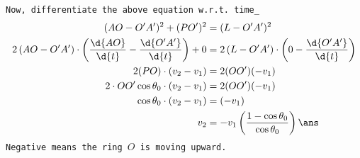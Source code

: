 \documentclass{article}
\begin{document}
\texttt{Now, differentiate the above equation w.r.t. time\_}
\addtolength{\jot}{2ex}
\begin{align*}
(AO-O'A')^2 + (PO')^2  &= (L-O'A')^2\\
2\left(AO-O'A'\right)\cdot \left(\dfrac{\d{AO}}{\d{t}} -\dfrac{\d{O'A'}}{\d{t}} \right) + 0 &=2\left(L-O'A'\right) \cdot \left( 0 - \dfrac{\d{O'A'}}{\d{t}} \right) \\ 
2(PO) \cdot \left( v_2 -v_1\right) &= 2(OO')(-v_1)\\
2\cdot OO'\cos\theta_0 \cdot (v_2-v_1) &= 2(OO')(-v_1)\\ 
\cos\theta_0 \cdot (v_2-v_1) &= (-v_1)\\ 
v_2 &= - v_1\left(\dfrac{1-\cos\theta_0}{\cos\theta_0}\right)\ans\\
\end{align*}
\texttt{Negative means the ring $O$ is moving upward.}
\pagebreak
\vspace*{\fill}
\begin{center}
	\fbox{\qrcode[height=2cm]{\gdrive}}
\end{center}
\vspace*{\fill}
\end{document}

